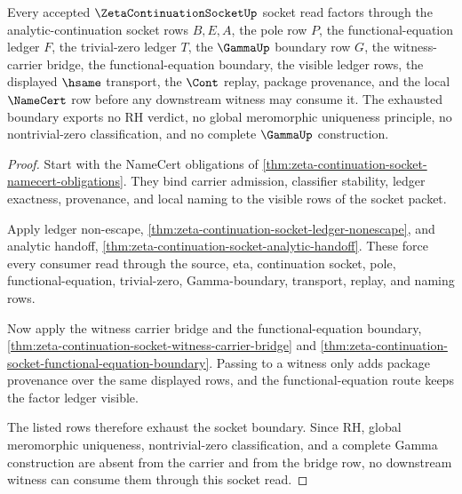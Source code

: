 \begin{theorem}
\label{thm:zeta-continuation-socket-boundary-exhaustion}
Every accepted $\ZetaContinuationSocketUp$ socket read factors through the analytic-continuation socket rows $B,E,A$, the pole row $P$, the functional-equation ledger $F$, the trivial-zero ledger $T$, the $\GammaUp$ boundary row $G$, the witness-carrier bridge, the functional-equation boundary, the visible ledger rows, the displayed $\hsame$ transport, the $\Cont$ replay, package provenance, and the local $\NameCert$ row before any downstream witness may consume it. The exhausted boundary exports no RH verdict, no global meromorphic uniqueness principle, no nontrivial-zero classification, and no complete $\GammaUp$ construction.
\end{theorem}
\begin{proof}
Start with the NameCert obligations of \autoref{thm:zeta-continuation-socket-namecert-obligations}. They bind carrier admission, classifier stability, ledger exactness, provenance, and local naming to the visible rows of the socket packet.

Apply ledger non-escape, \autoref{thm:zeta-continuation-socket-ledger-nonescape}, and analytic handoff, \autoref{thm:zeta-continuation-socket-analytic-handoff}. These force every consumer read through the source, eta, continuation socket, pole, functional-equation, trivial-zero, Gamma-boundary, transport, replay, and naming rows.

Now apply the witness carrier bridge and the functional-equation boundary, \autoref{thm:zeta-continuation-socket-witness-carrier-bridge} and \autoref{thm:zeta-continuation-socket-functional-equation-boundary}. Passing to a witness only adds package provenance over the same displayed rows, and the functional-equation route keeps the factor ledger visible.

The listed rows therefore exhaust the socket boundary. Since RH, global meromorphic uniqueness, nontrivial-zero classification, and a complete Gamma construction are absent from the carrier and from the bridge row, no downstream witness can consume them through this socket read.
\end{proof}

